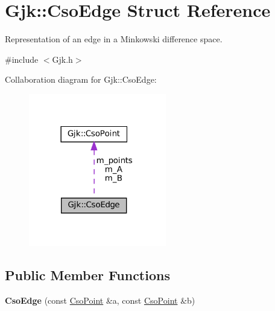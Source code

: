 \hypertarget{structGjk_1_1CsoEdge}{}\section{Gjk\+:\+:Cso\+Edge Struct Reference}
\label{structGjk_1_1CsoEdge}


Representation of an edge in a Minkowski difference space.  




{\ttfamily \#include $<$Gjk.\+h$>$}



Collaboration diagram for Gjk\+:\+:Cso\+Edge\+:
\nopagebreak
\begin{figure}[H]
\begin{center}
\leavevmode
\includegraphics[width=170pt]{structGjk_1_1CsoEdge__coll__graph}
\end{center}
\end{figure}
\subsection*{Public Member Functions}
\begin{DoxyCompactItemize}
\item 
\mbox{\label{structGjk_1_1CsoEdge_a8d9009b6a3943c070c62bbc826d5a83b}} 
{\bfseries Cso\+Edge} (const \hyperlink{structGjk_1_1CsoPoint}{Cso\+Point} \&a, const \hyperlink{structGjk_1_1CsoPoint}{Cso\+Point} \&b)
\end{DoxyCompactItemize}
